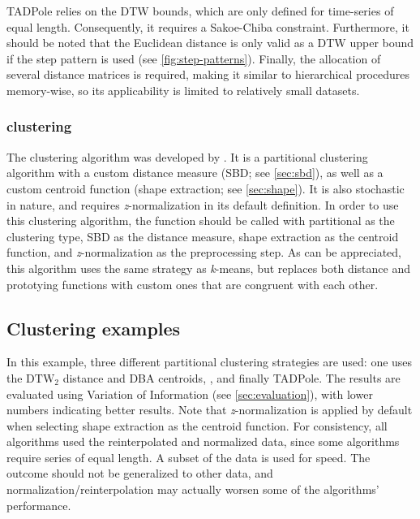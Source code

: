 TADPole relies on the DTW bounds,
which are only defined for time-series of equal length.
Consequently, it requires a Sakoe-Chiba constraint.
Furthermore, it should be noted that the Euclidean distance is only valid as a DTW upper bound if the  step pattern is used (see \cref{fig:step-patterns}).
Finally, the allocation of several distance matrices is required,
making it similar to hierarchical procedures memory-wise,
so its applicability is limited to relatively small datasets.

\subsubsection{\kshape{} clustering}
\label{sec:kshape}

The \kshape{} clustering algorithm was developed by \citet{paparrizos2015}.
It is a partitional clustering algorithm with a custom distance measure (SBD; see \cref{sec:sbd}),
as well as a custom centroid function (shape extraction; see \cref{sec:shape}).
It is also stochastic in nature,
and requires \textit{z}-normalization in its default definition.
In order to use this clustering algorithm,
the  function should be called with partitional as the clustering type,
SBD as the distance measure,
shape extraction as the centroid function,
and \textit{z}-normalization as the preprocessing step.
As can be appreciated,
this algorithm uses the same strategy as \textit{k}-means,
but replaces both distance and prototying functions with custom ones that are congruent with each other.

\subsection{Clustering examples}
\label{sec:partitional-example}

In this example,
three different partitional clustering strategies are used:
one uses the $\text{DTW}_2$ distance and DBA centroids,
\kshape{},
and finally TADPole.
The results are evaluated using Variation of Information
(see \cref{sec:evaluation}),
with lower numbers indicating better results.
Note that \textit{z}-normalization is applied by default when selecting shape extraction as the centroid function.
For consistency, all algorithms used the reinterpolated and normalized data,
since some algorithms require series of equal length.
A subset of the data is used for speed.
The outcome should not be generalized to other data,
and normalization/reinterpolation may actually worsen some of the algorithms' performance.

